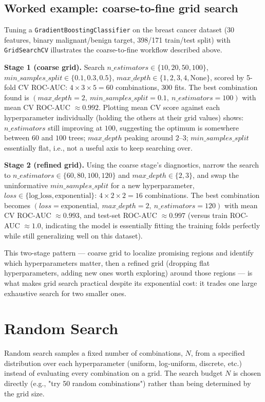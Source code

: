 \documentclass[conference]{IEEEtran}
\begin{document}
\subsection*{Worked example: coarse-to-fine grid search}
Tuning a \texttt{GradientBoostingClassifier} on the breast cancer dataset (30 features, binary malignant/benign target, 398/171 train/test split) with \texttt{GridSearchCV} illustrates the coarse-to-fine workflow described above.

\textbf{Stage 1 (coarse grid).} Search $n\_estimators \in \{10,20,50,100\}$, $min\_samples\_split \in \{0.1,0.3,0.5\}$, $max\_depth \in \{1,2,3,4,\text{None}\}$, scored by 5-fold CV ROC-AUC: $4 \times 3 \times 5 = 60$ combinations, $300$ fits. The best combination found is $(max\_depth=2,\ min\_samples\_split=0.1,\ n\_estimators=100)$ with mean CV ROC-AUC $\approx 0.992$. Plotting mean CV score against each hyperparameter individually (holding the others at their grid values) shows: $n\_estimators$ still improving at $100$, suggesting the optimum is somewhere between $60$ and $100$ trees; $max\_depth$ peaking around $2$–$3$; $min\_samples\_split$ essentially flat, i.e., not a useful axis to keep searching over.

\textbf{Stage 2 (refined grid).} Using the coarse stage's diagnostics, narrow the search to $n\_estimators \in \{60,80,100,120\}$ and $max\_depth \in \{2,3\}$, and swap the uninformative $min\_samples\_split$ for a new hyperparameter, $loss \in \{\text{log\_loss}, \text{exponential}\}$: $4 \times 2 \times 2 = 16$ combinations. The best combination becomes $(loss=\text{exponential},\ max\_depth=2,\ n\_estimators=120)$ with mean CV ROC-AUC $\approx 0.993$, and test-set ROC-AUC $\approx 0.997$ (versus train ROC-AUC $\approx 1.0$, indicating the model is essentially fitting the training folds perfectly while still generalizing well on this dataset).

This two-stage pattern — coarse grid to localize promising regions and identify which hyperparameters matter, then a refined grid (dropping flat hyperparameters, adding new ones worth exploring) around those regions — is what makes grid search practical despite its exponential cost: it trades one large exhaustive search for two smaller ones.

\section*{Random Search}
Random search samples a fixed number of combinations, $N$, from a specified distribution over each hyperparameter (uniform, log-uniform, discrete, etc.) instead of evaluating every combination on a grid. The search budget $N$ is chosen directly (e.g., "try 50 random combinations") rather than being determined by the grid size.
\end{document}
